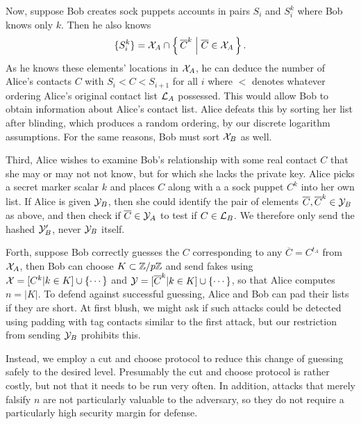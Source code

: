 \documentclass{article}
\begin{document}
Now, suppose Bob creates sock puppets accounts in pairs $S_i$ and $S_i^k$ where
Bob knows only $k$.  Then he also knows
\begin{equation}
   \{ S_i^k \} =
   {\cal X}_A \cap
   \Setst{ \overline{C}^k }{ \overline{C} \in {\cal X}_A }
  \mathperiod
\end{equation}
As he knows these elements' locations in ${\cal X}_A$,
he can deduce the number of Alice's contacts $C$ with
$S_i < C < S_{i+1}$ for all $i$ where $<$ denotes whatever
ordering Alice's original contact list ${\cal L}_A$ possessed.
This would allow Bob to obtain information
 about Alice's contact list.
Alice defeats this by sorting her list after blinding, which
produces a random ordering, by our discrete logarithm assumptions.
For the same reasons, Bob must sort ${\cal X}_B$ as well.

Third, Alice wishes to examine Bob's relationship with some real
contact $C$ that she may or may not not know, but for which she
lacks the private key.  Alice picks a secret marker scalar $k$
and places $C$ along with a a sock puppet $C^k$ into her own list.
If Alice is given ${\cal Y}_B$, then she could identify the pair
of elements  $\overline{C}, \overline{C}^k \in {\cal Y}_B$
 as above, and then check if $\overline{C} \in {\cal Y}_A$
to test if $C \in {\cal L}_B$.  We therefore only send
the hashed ${\cal Y}'_B$, never ${\cal Y}_B$ itself.


Forth, suppose Bob correctly guesses the $C$ corresponding to
 any $\overline{C} = C^{t_A}$ from ${\cal X}_A$, then
Bob can choose $K \subset \mathbb{Z}/p\mathbb{Z}$ and send fakes using
 ${\cal X} = [  C^k  |  k \in K  ] \cup \{ \cdots \}$ and
 ${\cal Y} = [  \overline{C}^k  |  k \in K  ] \cup \{ \cdots \}$,
so that Alice computes $n = |K|$.
To defend against successful guessing,
Alice and Bob can pad their lists if they are short.
At first blush, we might ask if such attacks could be detected using
padding with tag contacts similar to the first attack, but
our restriction from sending ${\cal Y}_B$ prohibits this.

Instead, we employ a cut and choose protocol to reduce this
change of guessing safely to the desired level.
Presumably the cut and choose protocol is rather costly, but
not that it needs to be run very often.  In addition, attacks that
merely falsify $n$ are not particularly valuable to the adversary, so
they do not require a particularly high security margin for defense.
\end{document}
